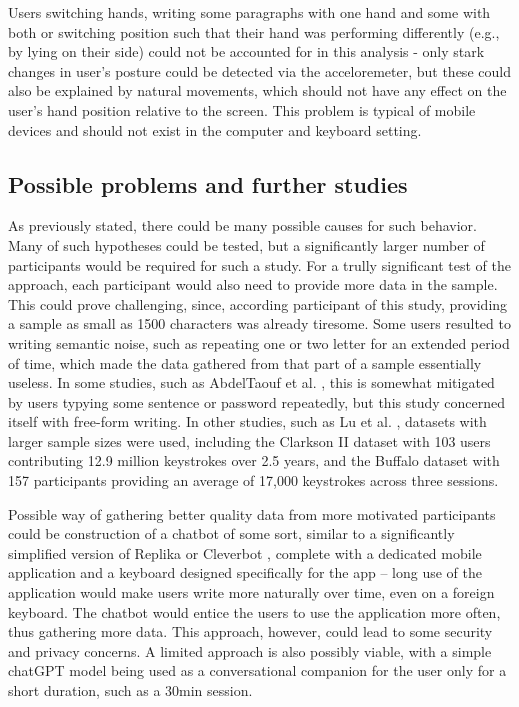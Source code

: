 Users switching hands, writing some paragraphs with one hand and some with both or switching position such that their hand was performing differently (e.g., by lying on their side) could not be accounted for in this analysis - only stark changes in user's posture could be detected via the acceloremeter, but these could also be explained by natural movements, which should not have any effect on the user's hand position relative to the screen. This problem is typical of mobile devices and should not exist in the computer and keyboard setting.

\subsection{Possible problems and further studies}
As previously stated, there could be many possible causes for such behavior. Many of such hypotheses could be tested, but a significantly larger number of participants would be required for such a study. For a trully significant test of the approach, each participant would also need to provide more data in the sample. This could prove challenging, since, according participant of this study, providing a sample as small as 1500 characters was already tiresome. Some users resulted to writing semantic noise, such as repeating one or two letter for an extended period of time, which made the data gathered from that part of a sample essentially useless. In some studies, such as AbdelTaouf et al. \cite{Abde2023}, this is somewhat mitigated by users typying some sentence or password repeatedly, but this study concerned itself with free-form writing. In other studies, such as Lu et al. \cite{Lu2020}, datasets with larger sample sizes were used, including the Clarkson II dataset with 103 users contributing 12.9 million keystrokes over 2.5 years, and the Buffalo dataset with 157 participants providing an average of 17,000 keystrokes across three sessions.

Possible way of gathering better quality data from more motivated participants could be construction of a chatbot of some sort, similar to a significantly simplified version of Replika \cite{replika} or Cleverbot \cite{cleverbot}, complete with a dedicated mobile application and a keyboard designed specifically for the app -- long use of the application would make users write more naturally over time, even on a foreign keyboard. The chatbot would entice the users to use the application more often, thus gathering more data. This approach, however, could lead to some security and privacy concerns. A limited approach is also possibly viable, with a simple chatGPT model being used as a conversational companion for the user only for a short duration, such as a 30min session.

